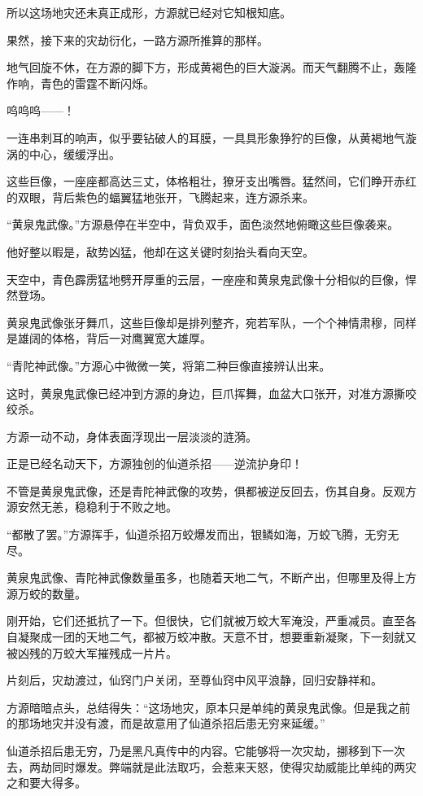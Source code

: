 \begin{this_body}
所以这场地灾还未真正成形，方源就已经对它知根知底。

果然，接下来的灾劫衍化，一路方源所推算的那样。

地气回旋不休，在方源的脚下方，形成黄褐色的巨大漩涡。而天气翻腾不止，轰隆作响，青色的雷霆不断闪烁。

呜呜呜——！

一连串刺耳的响声，似乎要钻破人的耳膜，一具具形象狰狞的巨像，从黄褐地气漩涡的中心，缓缓浮出。

这些巨像，一座座都高达三丈，体格粗壮，獠牙支出嘴唇。猛然间，它们睁开赤红的双眼，背后紫色的蝠翼猛地张开，飞腾起来，连方源杀来。

“黄泉鬼武像。”方源悬停在半空中，背负双手，面色淡然地俯瞰这些巨像袭来。

他好整以暇是，敌势凶猛，他却在这关键时刻抬头看向天空。

天空中，青色霹雳猛地劈开厚重的云层，一座座和黄泉鬼武像十分相似的巨像，悍然登场。

黄泉鬼武像张牙舞爪，这些巨像却是排列整齐，宛若军队，一个个神情肃穆，同样是雄阔的体格，背后一对鹰翼宽大雄厚。

“青陀神武像。”方源心中微微一笑，将第二种巨像直接辨认出来。

这时，黄泉鬼武像已经冲到方源的身边，巨爪挥舞，血盆大口张开，对准方源撕咬绞杀。

方源一动不动，身体表面浮现出一层淡淡的涟漪。

正是已经名动天下，方源独创的仙道杀招——逆流护身印！

不管是黄泉鬼武像，还是青陀神武像的攻势，俱都被逆反回去，伤其自身。反观方源安然无恙，稳稳利于不败之地。

“都散了罢。”方源挥手，仙道杀招万蛟爆发而出，银鳞如海，万蛟飞腾，无穷无尽。

黄泉鬼武像、青陀神武像数量虽多，也随着天地二气，不断产出，但哪里及得上方源万蛟的数量。

刚开始，它们还抵抗了一下。但很快，它们就被万蛟大军淹没，严重减员。直至各自凝聚成一团的天地二气，都被万蛟冲散。天意不甘，想要重新凝聚，下一刻就又被凶残的万蛟大军摧残成一片片。

片刻后，灾劫渡过，仙窍门户关闭，至尊仙窍中风平浪静，回归安静祥和。

方源暗暗点头，总结得失：“这场地灾，原本只是单纯的黄泉鬼武像。但是我之前的那场地灾并没有渡，而是故意用了仙道杀招后患无穷来延缓。”

仙道杀招后患无穷，乃是黑凡真传中的内容。它能够将一次灾劫，挪移到下一次去，两劫同时爆发。弊端就是此法取巧，会惹来天怒，使得灾劫威能比单纯的两灾之和要大得多。


\end{this_body}
